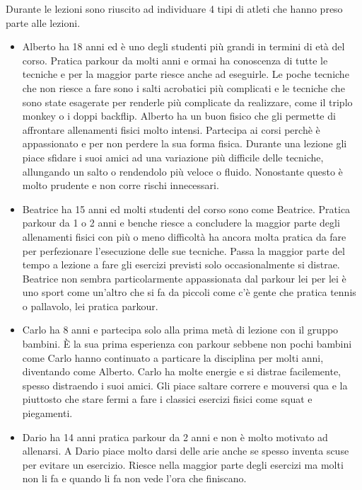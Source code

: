 Durante le lezioni sono riuscito ad individuare 4 tipi di atleti che hanno preso parte alle lezioni.
 \begin{itemize}
  \item Alberto ha 18 anni ed è uno degli studenti più grandi in termini di età del corso. Pratica parkour da molti anni e ormai ha conoscenza di tutte le tecniche e per la maggior parte riesce anche ad eseguirle. Le poche tecniche che non riesce a fare sono i salti acrobatici più complicati e le tecniche che sono state esagerate per renderle più complicate da realizzare, come il triplo monkey o i doppi backflip. Alberto ha un buon fisico che gli permette di affrontare allenamenti fisici molto intensi. Partecipa ai corsi perchè è appassionato e per non perdere la sua forma fisica. Durante una lezione gli piace sfidare i suoi amici ad una variazione più difficile delle tecniche, allungando un salto o rendendolo più veloce o fluido. Nonostante questo è molto prudente e non corre rischi innecessari.

  \item Beatrice ha 15 anni ed molti studenti del corso sono come Beatrice. Pratica parkour da 1 o 2 anni e benche riesce a concludere la maggior parte degli allenamenti fisici con più o meno difficoltà ha ancora molta pratica da fare per perfezionare l'esecuzione delle sue tecniche. Passa la maggior parte del tempo a lezione a fare gli esercizi previsti solo occasionalmente si distrae. Beatrice non sembra particolarmente appassionata dal parkour lei per lei è uno sport come un'altro che si fa da piccoli come c'è gente che pratica tennis o pallavolo, lei pratica parkour.

  \item Carlo ha 8 anni e partecipa solo alla prima metà di lezione con il gruppo bambini. È la sua prima esperienza con parkour sebbene non pochi bambini come Carlo hanno continuato a particare la disciplina per molti anni, diventando come Alberto. Carlo ha molte energie e si distrae facilemente, spesso distraendo i suoi amici. Gli piace saltare correre e mouversi qua e la piuttosto che stare fermi a fare i classici esercizi fisici come squat e piegamenti.

  \item Dario ha 14 anni pratica parkour da 2 anni e non è molto motivato ad allenarsi. A Dario piace molto darsi delle arie anche se spesso inventa scuse per evitare un esercizio. Riesce nella maggior parte degli esercizi ma molti non li fa e quando li fa non vede l'ora che finiscano.
\end {itemize}


